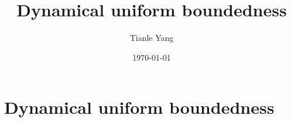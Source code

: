 \documentclass[sectionlevel=section,status=draft]{noteformyself}
\title{Dynamical uniform boundedness}
\author{Tianle Yang}
\date{\today}
\begin{document}
    \maketitle

    \section[
      status=draft,
      tag=00000,
      label=\labelNFM{sec:endomorphisms-on-projective-spaces:dynamical-uniform-boundedness}
    ]{Dynamical uniform boundedness}

    

    \printbibliography[heading=bibintoc, title={References}]
\end{document}
